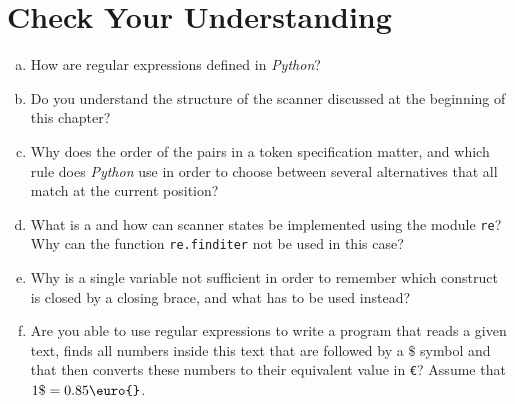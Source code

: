 \section{Check Your Understanding}
\begin{enumerate}[(a)]
\item How are regular expressions defined in \textsl{Python}?
\item Do you understand the structure of the scanner discussed at the beginning of this chapter?
\item Why does the order of the pairs in a token specification matter, and which rule does
      \textsl{Python} use in order to choose between several alternatives that all match at the current
      position?
\item What is a  and how can scanner states be implemented using the module
      \texttt{re}?  Why can the function \texttt{re.finditer} not be used in this case?
\item Why is a single variable not sufficient in order to remember which construct is closed by a closing
      brace, and what has to be used instead?
\item Are you able to use regular expressions to write a program that reads a given text, finds all numbers inside
      this text that are followed by a $\texttt{\$}$ symbol and that then converts these numbers to their
      equivalent  value in \texttt{\euro{}}?  Assume that $1 \mathtt{\$} = 0.85 \texttt{\euro{}}$.
\end{enumerate}



